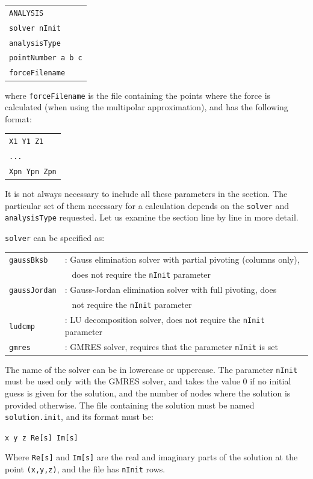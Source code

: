 \documentclass[12pt]{article}
\begin{document}
\begin{tabular}{l}
\texttt{ANALYSIS}\\
\texttt{solver nInit}\\
\texttt{analysisType}\\
\texttt{pointNumber a b c}\\
\texttt{forceFilename}
\end{tabular}

where \verb+forceFilename+ is the file containing the points where the force is calculated (when using the multipolar approximation), and has the following format:

\begin{tabular}{l}
\texttt{X1 Y1 Z1}\\
\texttt{...}\\
\texttt{Xpn Ypn Zpn}
\end{tabular}

It is not always necessary to include all these parameters in the section. The particular set of them necessary for a calculation depends on the \verb+solver+ and \verb+analysisType+ requested. Let us examine the section line by line in more detail.

\verb+solver+ can be specified as:

\begin{tabular}{ll}
\texttt{gaussBksb}&: Gauss elimination solver with partial pivoting (columns only),\\
  & \verb+ + does not require the \texttt{nInit} parameter\\
\texttt{gaussJordan}&: Gauss-Jordan elimination solver with full pivoting, does \\
  & \verb+ + not require the \texttt{nInit} parameter\\
\texttt{ludcmp}&: LU decomposition solver, does not require the \texttt{nInit} parameter\\
\texttt{gmres}&: GMRES solver, requires that the parameter \texttt{nInit} is set
\end{tabular}

The name of the solver can be in lowercase or uppercase. The parameter \verb+nInit+ must be used only with the GMRES solver, and takes the value 0 if no initial guess is given for the solution, and the number of nodes where the solution is provided otherwise. The file containing the solution must be named \verb+solution.init+, and its format must be:

\texttt{x y z Re[s] Im[s]}

Where \verb+Re[s]+ and \verb+Im[s]+ are the real and imaginary parts of the solution at the point \verb+(x,y,z)+, and the file has \verb+nInit+ rows.
\end{document}

